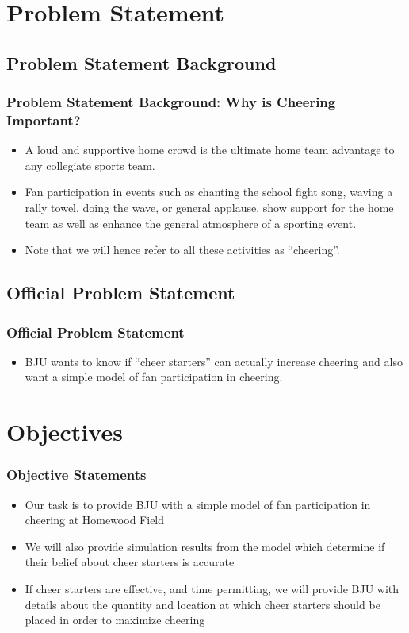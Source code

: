 \documentclass[compress,handout,10pt]{beamer}
\let\olditem\item
\renewcommand{\item}{\setlength{\itemsep}{0.5\baselineskip}\olditem}
\begin{document}
\section{Problem Statement}

\subsection{Problem Statement Background}

\begin{frame}
	\frametitle{Problem Statement Background: Why is Cheering Important?}
	\begin{itemize}
	\item A loud and supportive home crowd is the ultimate home team advantage to any collegiate sports team.
	\item Fan participation in events such as chanting the school fight song, waving a rally towel, doing the wave, or general applause, show support for the home team as well as enhance the general atmosphere of a sporting event.
	\item Note that we will hence refer to all these activities as ``cheering''.
	\end{itemize}
\end{frame}

\subsection{Official Problem Statement}

\begin{frame}
	\frametitle{Official Problem Statement}
		\begin{itemize}
			\item BJU wants to know if ``cheer starters'' can actually increase cheering and also want a simple model of fan participation in cheering.
		\end{itemize}
\end{frame}

\section {Objectives}

\begin{frame}
	\frametitle{Objective Statements}
		\begin{itemize}
			\item Our task is to provide BJU with a simple model of fan participation in cheering at Homewood Field
			\item We will also provide simulation results from the model which determine if their belief about cheer starters is accurate
			\item If cheer starters are effective, and time permitting, we will provide BJU with details about the quantity and location at which cheer starters should be placed in order to maximize cheering
		\end{itemize}
\end{frame}
\end{document}
